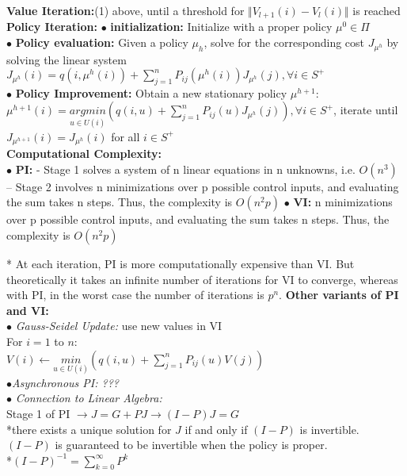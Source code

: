 \documentclass[10pt,landscape]{article}
\begin{document}
\begin{multicols*}{4}
\textbf{Value Iteration:}(1) above, until a threshold for $\Vert V_{l+1}(i) - V_l(i) \Vert$ is reached\\
\textbf{Policy Iteration:}
$\bullet$ \textbf{initialization: }Initialize with a proper policy $\mu^{0} \in \Pi$\\
$\bullet$ \textbf{Policy evaluation: }Given a policy $\mu_h$, solve for the
corresponding cost $J_{\mu^h}$ by solving the linear system\\
$J_{\mu^h}(i) = q(i, \mu^h(i)) + \sum_{j=1}^{n} P_{ij} (\mu^h(i)) J_{\mu^h}(j), \forall i \in S^{+}$\\
$\bullet$ \textbf{Policy Improvement: }
Obtain a new stationary policy $\mu^{h+1}$:\\
$\mu^{h+1}(i) = \underset{u\in U(i)}{argmin} (q(i,u) + \sum_{j=1}^{n} P_{ij}(u) J_{\mu^h}(j)), \forall i \in S^{+}$, iterate until $J_{\mu^{h+1}}(i) = J_{\mu^h}(i)$ for all $i \in S^{+}$\\

\textbf{Computational Complexity: }\\
$\bullet$ \textbf{PI: }- Stage 1 solves a system of n linear equations in n unknowns, i.e. $O(n^3)$
– Stage 2 involves n minimizations over p possible control inputs, and evaluating the sum takes n steps. Thus, the complexity is $O(n^2 p)$
$\bullet$ \textbf{VI: } n minimizations over p possible control inputs, and evaluating the sum takes n steps. Thus, the complexity is $O(n^2 p)$

* At each iteration, PI is more computationally expensive than VI. But theoretically it takes an infinite number of iterations for VI to converge, whereas with PI, in the worst case the number of iterations is $p^n$.
\textbf{Other variants of PI and VI: }\\
$\bullet$ \textit{Gauss-Seidel Update: } use new values in VI\\
For $i = 1$ to $n:$\\
$V(i) \leftarrow \underset{u \in U(i)}{min} (q(i,u) + \sum_{j=1}^{n} P_{ij}(u)V(j))$\\

$\bullet$\textit{Asynchronous PI: ???}\\
$\bullet$ \textit{Connection to Linear Algebra: }\\
Stage 1 of PI $\rightarrow J = G + PJ \rightarrow (I-P)J=G$\\
*there exists a unique solution for $J$ if and only if $(I - P)$ is invertible. $(I - P)$ is guaranteed to be invertible when the policy is proper. \\
*$(I-P) ^ {-1} = \sum_{k=0}^{\infty} P^k$


\end{multicols*}
\end{document}
